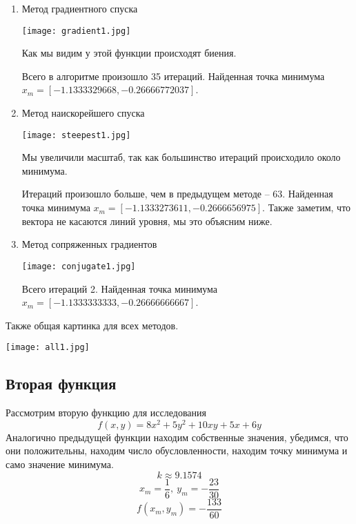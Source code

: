 \begin{enumerate}
    \item Метод градиентного спуска
    
    \texttt{[image: gradient1.jpg]}

    Как мы видим у этой функции происходят биения.

    Всего в алгоритме произошло 35 итераций. Найденная точка минимума
    $x_m = [-1.1333329668, -0.26666772037]$.

    \item Метод наискорейшего спуска
    
    \texttt{[image: steepest1.jpg]}

    Мы увеличили масштаб, так как большинство итераций происходило
    около минимума.

    Итераций произошло больше, чем в предыдущем методе -- 63.
    Найденная точка минимума $x_m = [-1.1333273611, -0.2666656975]$.
    Также заметим, что вектора не касаются линий уровня, мы это объясним ниже.

    \item Метод сопряженных градиентов

    \texttt{[image: conjugate1.jpg]}

    Всего итераций 2.
    Найденная точка минимума \newline $x_m = [-1.1333333333, -0.26666666667]$.

\end{enumerate}

Также общая картинка для всех методов.

\texttt{[image: all1.jpg]}


 \subsection{Вторая функция}
Рассмотрим вторую функцию для исследования $$f(x, y) = 8x^2 + 5y^2 + 10xy + 5x + 6y$$
Аналогично предыдущей функции находим собственные значения, убедимся, что они положительны, находим число
обусловленности, находим точку минимума
и само значение минимума.
$$k \approx 9.1574$$
$$x_m = \frac{1}{6},\ y_m = -\frac{23}{30}$$
$$f(x_m, y_m) = -\frac{133}{60}$$

